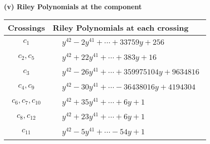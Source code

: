 \documentclass[1p]{elsarticle_modified}
\theoremstyle{definition}
\begin{document}
\flushleft \textbf{(v) Riley Polynomials at the component}\newline \\
\begin{tabular}{m{50pt}|m{274pt}}
Crossings & \hspace{64pt}Riley Polynomials at each crossing \\
\hline $$\begin{aligned}c_{1}\end{aligned}$$&$\begin{aligned}
&y^{42}-2 y^{41}+\cdots+33759 y+256
\end{aligned}$\\
\hline $$\begin{aligned}c_{2},c_{5}\end{aligned}$$&$\begin{aligned}
&y^{42}+22 y^{41}+\cdots+383 y+16
\end{aligned}$\\
\hline $$\begin{aligned}c_{3}\end{aligned}$$&$\begin{aligned}
&y^{42}-26 y^{41}+\cdots+359975104 y+9634816
\end{aligned}$\\
\hline $$\begin{aligned}c_{4},c_{9}\end{aligned}$$&$\begin{aligned}
&y^{42}-30 y^{41}+\cdots-36438016 y+4194304
\end{aligned}$\\
\hline $$\begin{aligned}c_{6},c_{7},c_{10}\end{aligned}$$&$\begin{aligned}
&y^{42}+35 y^{41}+\cdots+6 y+1
\end{aligned}$\\
\hline $$\begin{aligned}c_{8},c_{12}\end{aligned}$$&$\begin{aligned}
&y^{42}+23 y^{41}+\cdots+6 y+1
\end{aligned}$\\
\hline $$\begin{aligned}c_{11}\end{aligned}$$&$\begin{aligned}
&y^{42}-5 y^{41}+\cdots-54 y+1
\end{aligned}$\\
\hline
\end{tabular}\\~\\
\end{document}
